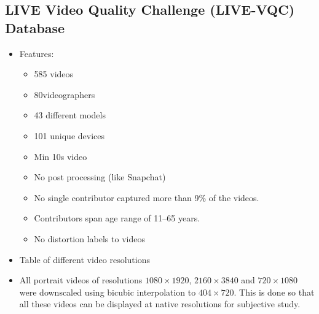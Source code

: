 \documentclass{article}
\begin{document}
    \subsection{LIVE Video Quality Challenge (LIVE-VQC) Database}\label{subsec:Large_Scale_Study_of_Perceptual_Video_Quality_(LIVE_VQC_Database):database}
    \begin{itemize}
        \item Features:
        \begin{itemize}
            \item 585 videos
            \item 80videographers
            \item 43 different models
            \item 101 unique devices
            \item Min 10s video
            \item No post processing (like Snapchat)
            \item No single contributor captured more than 9\% of the videos.
            \item Contributors span age range of 11--65 years.
            \item No distortion labels to videos
        \end{itemize}
        \item Table of different video resolutions
        \item All portrait videos of resolutions $1080 \times 1920$, $2160 \times 3840$ and $720 \times 1080$ were downscaled using bicubic interpolation to $404 \times 720$.
        This is done so that all these videos can be displayed at native resolutions for subjective study.
    \end{itemize}
\end{document}
